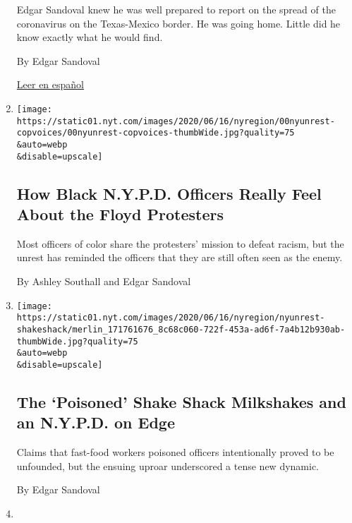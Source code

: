 \begin{enumerate}
  Edgar Sandoval knew he was well prepared to report on the spread of
  the coronavirus on the Texas-Mexico border. He was going home. Little
  did he know exactly what he would find.

  By Edgar Sandoval

  \href{https://www.nytimes.com/es/2020/07/14/espanol/texas-coronavirus-rio-grande-valley.html}{Leer
  en español}
\item
  \href{/2020/06/17/nyregion/black-hispanic-officers-nypd-protests.html}{}

  \texttt{[image: https://static01.nyt.com/images/2020/06/16/nyregion/00nyunrest-copvoices/00nyunrest-copvoices-thumbWide.jpg?quality=75\\\&auto=webp\\\&disable=upscale]}

  \hypertarget{how-black-nypd-officers-really-feel-about-the-floyd-protesters}{%
  \subsection{How Black N.Y.P.D. Officers Really Feel About the Floyd
  Protesters}\label{how-black-nypd-officers-really-feel-about-the-floyd-protesters}}

  Most officers of color share the protesters' mission to defeat racism,
  but the unrest has reminded the officers that they are still often
  seen as the enemy.

  By Ashley Southall and Edgar Sandoval
\item
  \href{/2020/06/16/nyregion/shake-shack-police-nypd.html}{}

  \texttt{[image: https://static01.nyt.com/images/2020/06/16/nyregion/nyunrest-shakeshack/merlin\_171761676\_8c68c060-722f-453a-ad6f-7a4b12b930ab-thumbWide.jpg?quality=75\\\&auto=webp\\\&disable=upscale]}

  \hypertarget{the-poisoned-shake-shack-milkshakes-and-an-nypd-on-edge}{%
  \subsection{The `Poisoned' Shake Shack Milkshakes and an N.Y.P.D. on
  Edge}\label{the-poisoned-shake-shack-milkshakes-and-an-nypd-on-edge}}

  Claims that fast-food workers poisoned officers intentionally proved
  to be unfounded, but the ensuing uproar underscored a tense new
  dynamic.

  By Edgar Sandoval
\item
  \href{/2020/06/11/nyregion/jahmel-leach-arrest.html}{}


\end{enumerate}
